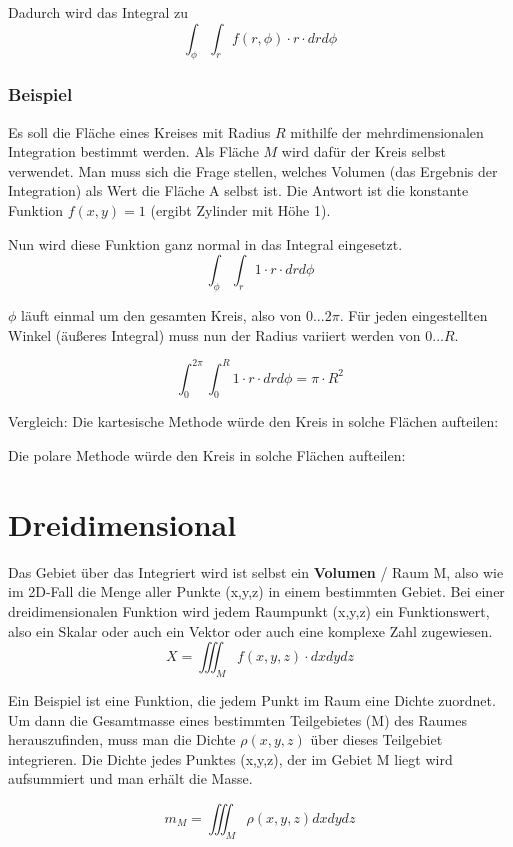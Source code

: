 \documentclass[11pt, a4paper]{article}
\newcommand{\colorEmph}[1]{\textbf{\color{blue-5}#1}}
\begin{document}
Dadurch wird das Integral zu
\[\int_{\phi}\int_{r}{f(r,\phi) \cdot r \cdot drd\phi}\]

\subsubsection{Beispiel}
Es soll die Fläche eines Kreises mit Radius $R$ mithilfe der mehrdimensionalen Integration bestimmt werden. Als Fläche $M$ wird dafür der Kreis selbst verwendet. Man muss sich die Frage stellen, welches Volumen (das Ergebnis der Integration) als Wert die Fläche A selbst ist. Die Antwort ist die konstante Funktion $f(x,y) = 1$ (ergibt Zylinder mit Höhe 1).

\begin{figure}[H]
\centering
{}
\end{figure}

Nun wird diese Funktion ganz normal in das Integral eingesetzt.
\[\int_{\phi}\int_{r}{1 \cdot r \cdot drd\phi}\]

$\phi$ läuft einmal um den gesamten Kreis, also von $0...2\pi$. Für jeden eingestellten Winkel (äußeres Integral) muss nun der Radius variiert werden von $0...R$.

\[\int_{0}^{2\pi}\int_{0}^{R}{1 \cdot r \cdot drd\phi} = \pi \cdot R^{2}\]

Vergleich: Die kartesische Methode würde den Kreis in solche Flächen aufteilen:

\begin{figure}[H]
\centering
{}
\end{figure}

Die polare Methode würde den Kreis in solche Flächen aufteilen:

\begin{figure}[H]
\centering
{}
\end{figure}


\section{Dreidimensional}
Das Gebiet über das Integriert wird ist selbst ein \colorEmph{Volumen} / Raum M, also wie im 2D-Fall die Menge aller Punkte (x,y,z) in einem bestimmten Gebiet.
Bei einer dreidimensionalen Funktion wird jedem Raumpunkt (x,y,z) ein Funktionswert, also ein Skalar oder auch ein Vektor oder auch eine komplexe Zahl zugewiesen.
\[X=\iiint_{M}{f(x,y,z) \cdot dxdydz}\]

Ein Beispiel ist eine Funktion, die jedem Punkt im Raum eine Dichte zuordnet. Um dann die Gesamtmasse eines bestimmten Teilgebietes (M) des Raumes herauszufinden, muss man die Dichte $\rho(x,y,z)$ über dieses Teilgebiet integrieren. Die Dichte jedes Punktes (x,y,z), der im Gebiet M liegt wird aufsummiert und man erhält die Masse.

\[m_{M} = \iiint_{M}{\rho(x,y,z) dxdydz}\]


\end{document}
